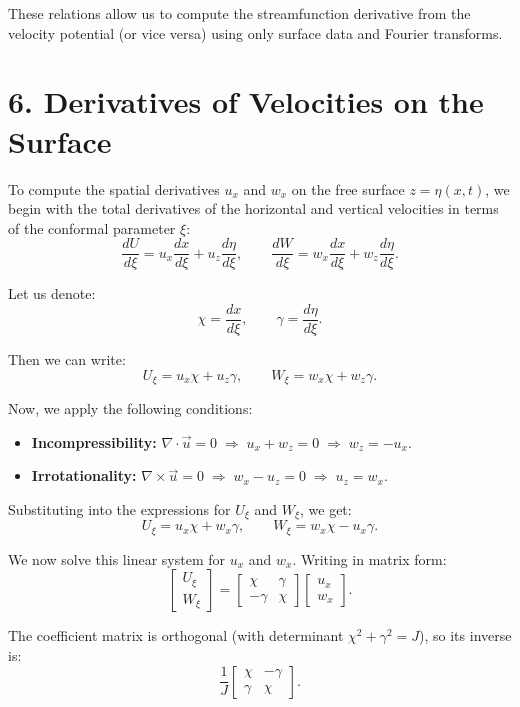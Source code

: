 \documentclass[12pt]{article}
\begin{document}
These relations allow us to compute the streamfunction derivative from the velocity potential (or vice versa) using only surface data and Fourier transforms.

\section*{6. Derivatives of Velocities on the Surface}

To compute the spatial derivatives $u_x$ and $w_x$ on the free surface $z = \eta(x,t)$, we begin with the total derivatives of the horizontal and vertical velocities in terms of the conformal parameter $\xi$:
\[
\frac{dU}{d\xi} = u_x \frac{dx}{d\xi} + u_z \frac{d\eta}{d\xi}, \qquad 
\frac{dW}{d\xi} = w_x \frac{dx}{d\xi} + w_z \frac{d\eta}{d\xi}.
\]

Let us denote:
\[
\chi = \frac{dx}{d\xi}, \qquad \gamma = \frac{d\eta}{d\xi}.
\]

Then we can write:
\[
    U_\xi = u_x \chi + u_z \gamma, \qquad
    W_\xi = w_x \chi + w_z \gamma.
\]

Now, we apply the following conditions:
\begin{itemize}
  \item \textbf{Incompressibility:} $\nabla \cdot \vec{u} = 0 \;\Longrightarrow\; u_x + w_z = 0 \;\Longrightarrow\; w_z = -u_x$.
  \item \textbf{Irrotationality:}  $\nabla \times \vec{u} = 0 \;\Longrightarrow\; w_x - u_z = 0 \;\Longrightarrow\; u_z = w_x$.
\end{itemize}
Substituting into the expressions for \(U_\xi\) and \(W_\xi\), we get:
\[
    U_\xi = u_x \chi + w_x \gamma, \qquad
    W_\xi = w_x \chi - u_x \gamma.
\]

We now solve this linear system for \(u_x\) and \(w_x\). Writing in matrix form:
\[
\begin{bmatrix}
U_\xi \\
W_\xi
\end{bmatrix}
=
\begin{bmatrix}
\chi & \gamma \\
-\gamma & \chi
\end{bmatrix}
\begin{bmatrix}
u_x \\
w_x
\end{bmatrix}.
\]

The coefficient matrix is orthogonal (with determinant $\chi^2 + \gamma^2 = J$), so its inverse is:
\[
\frac{1}{J}
\begin{bmatrix}
\chi & -\gamma \\
\gamma & \chi
\end{bmatrix}.
\]
\end{document}
